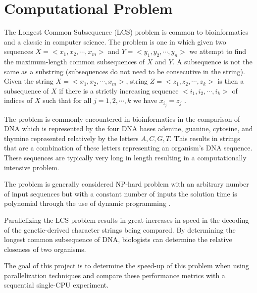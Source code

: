 \section{Computational Problem}
The Longest Common Subsequence (LCS) problem is common to bioinformatics and a classic in computer science.  The problem is one in which given two sequences $X=<x_1,x_2,\cdots,x_m>$ and $Y=<y_1,y_2,\cdots,y_n>$ we attempt to find the maximum-length common subsequences of $X$ and $Y$. A subsequence is not the same as a substring (subsequences do not need to be consecutive in the string). Given the string $X=<x_1,x_2,\cdots,x_m>$, string $Z=<z_1,z_2,\cdots,z_k>$ is then a subsequence of $X$ if there is a strictly increasing sequence $<i_1,i_2,\cdots,i_k>$ of indices of $X$ such that for all $j=1,2,\cdots,k$ we have $x_{i_j} = z_j$ \cite{cormen01}.

The problem is commonly encountered in bioinformatics in the comparison of DNA which is represented by the four DNA bases adenine, guanine, cytosine, and thymine represented relatively by the letters ${A,C,G,T}$. This results in strings that are a combination of these letters representing an organism's DNA sequence. These sequences are typically very long in length resulting in a computationally intensive problem.

The problem is generally considered NP-hard problem with an arbitrary number of input sequences but with a constant number of inputs the solution time is polynomial through the use of dynamic programming \cite{wiki}.

Parallelizing the LCS problem results in great increases in speed in the decoding of the genetic-derived character strings being compared. By determining the longest common subsequence of DNA, biologists can determine the relative closeness of two organisms.

The goal of this project is to determine the speed-up of this problem when using parallelization techniques and compare these performance metrics with a sequential single-CPU experiment.
